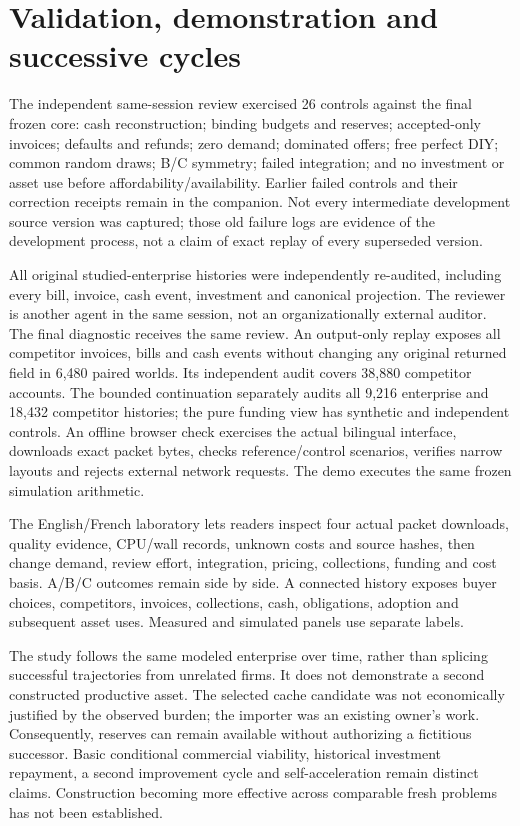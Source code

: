 \documentclass[11pt,a4paper]{article}
\begin{document}
\section{Validation, demonstration and successive cycles}
The independent same-session review exercised 26 controls against the final frozen core:
cash reconstruction; binding budgets and reserves; accepted-only invoices; defaults and refunds;
zero demand; dominated offers; free perfect DIY; common random draws; B/C symmetry; failed
integration; and no investment or asset use before affordability/availability.
Earlier failed controls and their correction receipts remain in the companion.
Not every intermediate development source version was captured; those old failure logs are
evidence of the development process, not a claim of exact replay of every superseded version.

All original studied-enterprise histories were independently re-audited, including every bill,
invoice, cash event, investment and canonical projection. The reviewer is another agent in the
same session, not an organizationally external auditor. The final diagnostic receives the same
review. An output-only replay exposes all competitor invoices, bills and cash events without
changing any original returned field in 6,480 paired worlds. Its independent audit covers
38,880 competitor accounts. The bounded continuation separately audits all 9,216 enterprise
and 18,432 competitor histories; the pure funding view has synthetic and independent controls. An offline browser check exercises the actual bilingual interface, downloads exact packet
bytes, checks reference/control scenarios, verifies narrow layouts and rejects external network
requests. The demo executes the same frozen simulation arithmetic.

The English/French laboratory lets readers inspect four actual packet downloads, quality evidence,
CPU/wall records, unknown costs and source hashes, then change demand, review effort, integration,
pricing, collections, funding and cost basis. A/B/C outcomes remain side by side. A connected
history exposes buyer choices, competitors, invoices, collections, cash, obligations, adoption and
subsequent asset uses. Measured and simulated panels use separate labels.

The study follows the same modeled enterprise over time, rather than splicing successful
trajectories from unrelated firms. It does not demonstrate a second constructed productive asset.
The selected cache candidate was not economically justified by the observed burden; the importer
was an existing owner's work. Consequently, reserves can remain available without authorizing
a fictitious successor. Basic conditional commercial viability, historical investment repayment,
a second improvement cycle and self-acceleration remain distinct claims. Construction becoming
more effective across comparable fresh problems has not been established.
\end{document}
